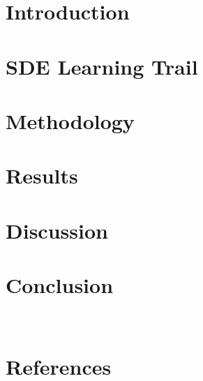 \documentclass[a4paper]{jpconf} %
\begin{document}


\section{Introduction}
\label{ch:introduction}


\section{SDE Learning Trail}
\label{ch:SDELT}


\section{Methodology}
\label{ch:method}


\section{Results}
\label{ch:results}



\section{Discussion}
\label{ch:discussion}


\section{Conclusion}
\label{ch:conclusion}
\\

% 

%  


\section*{References}
   
  
\end{document}
